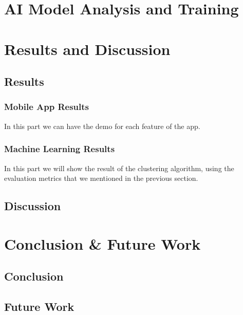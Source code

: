 \documentclass{article}
\begin{document}
\section{AI Model Analysis and Training}

\section{Results and Discussion}
\subsection{Results}

\subsubsection{Mobile App Results}
In this part we can have the demo for each feature of the app.

\subsubsection{Machine Learning Results}
In this part we will show the result of the clustering algorithm, using the evaluation 
metrics that we mentioned in the previous section.

\subsection{Discussion}

\section{Conclusion {\&} Future Work}

\subsection{Conclusion}
\subsection{Future Work}
\end{document}
